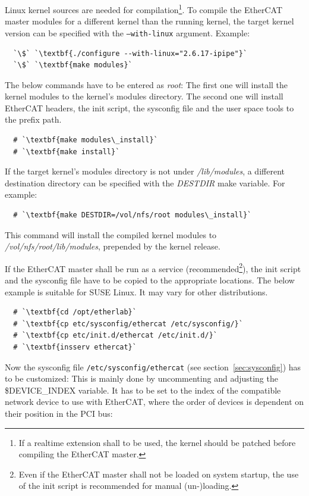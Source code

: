 \documentclass[a4paper,12pt,BCOR6mm,bibtotoc,idxtotoc]{scrbook}
\begin{document}
Linux kernel sources are needed for compilation\footnote{If a realtime
  extension shall to be used, the kernel should be patched before
  compiling the EtherCAT master.}. To compile the EtherCAT master
modules for a different kernel than the running kernel, the target
kernel version can be specified with the \texttt{--with-linux}
argument. Example:

\begin{lstlisting}
  `\$` `\textbf{./configure --with-linux="2.6.17-ipipe"}`
  `\$` `\textbf{make modules}`
\end{lstlisting}

The below commands have to be entered as \textit{root}: The first one
will install the kernel modules to the kernel's modules directory. The
second one will install EtherCAT headers, the init script, the
sysconfig file and the user space tools to the prefix path.

\begin{lstlisting}
  # `\textbf{make modules\_install}`
  # `\textbf{make install}`
\end{lstlisting}

If the target kernel's modules directory is not under
\textit{/lib/modules}, a different destination directory can be
specified with the \textit{DESTDIR} make variable. For example:

\begin{lstlisting}
  # `\textbf{make DESTDIR=/vol/nfs/root modules\_install}`
\end{lstlisting}

This command will install the compiled kernel modules to
\textit{/vol/nfs/root/lib/modules}, prepended by the kernel release.

If the EtherCAT master shall be run as a service
(recommended\footnote{Even if the EtherCAT master shall not be loaded
  on system startup, the use of the init script is recommended for
  manual (un-)loading.}), the init script and the sysconfig file have
to be copied to the appropriate locations. The below example is
suitable for SUSE Linux.  It may vary for other distributions.

\begin{lstlisting}
  # `\textbf{cd /opt/etherlab}`
  # `\textbf{cp etc/sysconfig/ethercat /etc/sysconfig/}`
  # `\textbf{cp etc/init.d/ethercat /etc/init.d/}`
  # `\textbf{insserv ethercat}`
\end{lstlisting}

Now the sysconfig file \texttt{/etc/sysconfig/ethercat} (see
section~\ref{sec:sysconfig}) has to be customized: This is mainly done
by uncommenting and adjusting the \$DEVICE\_INDEX variable. It has to
be set to the index of the compatible network device to use with
EtherCAT, where the order of devices is dependent on their position in
the PCI bus:
\end{document}
